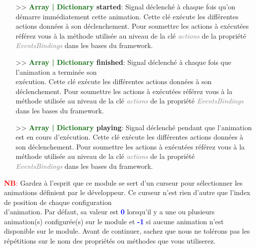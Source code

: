 \documentclass[a4paper, 11pt]{article}
\begin{document}
\begin{itemize}
		\newpage \item[>> \textbf{\textcolor{darkgreen}{Array | Dictionary} started}:] Signal déclenché à 
		chaque fois qu'on démarre immédiatement cette animation. Cette clé exécute les différentes actions 
		données à son déclenchement. Pour soumettre les actions à exécutées référez vous à la méthode
		utilisée au niveau de la clé \textit{\textcolor{gray}{actions}} de la propriété
		\textit{\textcolor{gray}{EventsBindings}} dans les bases du framework.\\
		\item[>> \textbf{\textcolor{darkgreen}{Array | Dictionary} finished}:] Signal déclenché à chaque 
		fois que l'animation a terminée son \\exécution. Cette clé exécute les différentes actions données à 
		son déclenchement. Pour soumettre les actions à exécutées référez vous à la méthode utilisée au
		niveau de la clé \textit{\textcolor{gray}{actions}} de la propriété \textit{\textcolor{gray}
		{EventsBindings}} dans les bases du framework.\\
		\item[>> \textbf{\textcolor{darkgreen}{Array | Dictionary} playing}:] Signal déclenché pendant que
		l'animation est en cours d'exécution. Cette clé exécute les différentes actions données
		à son déclenchement. Pour soumettre les actions à exécutées référez vous à la méthode utilisée au
		niveau de la clé \textit{\textcolor{gray}{actions}} de la propriété \textit{\textcolor{gray}
		{\\EventsBindings}} dans les bases du framework.\\
	\end{itemize}
	\textcolor{red}{\textbf{NB}:} Gardez à l'esprit que ce module se sert d'un curseur pour sélectionner les 
	animations définient par le développeur. Ce curseur n'est rien d'autre que l'index de position de chaque 
	configuration \\d'animation. Par défaut, sa valeur est \textbf{\textcolor{blue}{0}} lorsqu'il y a une ou 
	plusieurs animation(s) configurée(s) sur le module et \textbf{\textcolor{blue}{-1}} si aucune animation 
	n'est disponible sur le module. Avant de continuer, sachez que nous ne tolérons pas les répétitions sur 
	le nom des propriétés ou méthodes que vous utiliserez.

\end{document}
